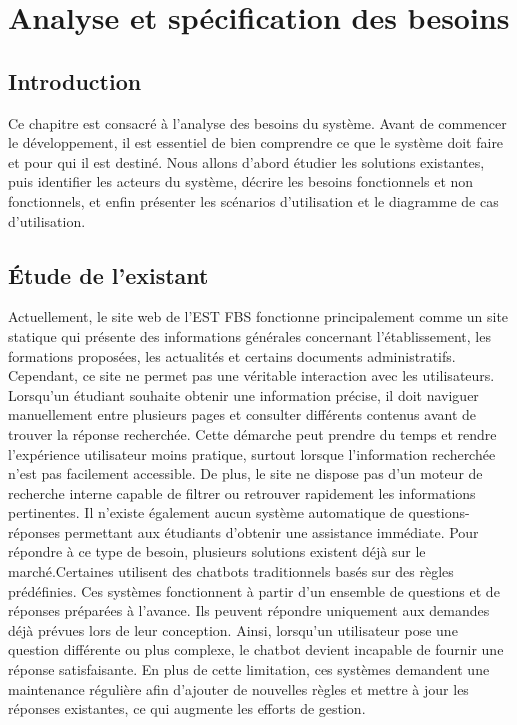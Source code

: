 \documentclass[12pt,a4paper]{report}
\begin{document}
\chapter{Analyse et spécification des besoins}

\section{Introduction}
Ce chapitre est consacré à l'analyse des besoins du système. Avant de commencer le développement, il est essentiel de bien comprendre ce que le système doit faire et pour qui il est destiné. Nous allons d'abord étudier les solutions existantes, puis identifier les acteurs du système, décrire les besoins fonctionnels et non fonctionnels, et enfin présenter les scénarios d'utilisation et le diagramme de cas d'utilisation.

\section{Étude de l'existant}
Actuellement, le site web de l’EST FBS fonctionne principalement comme un site \newline statique qui présente des informations générales concernant l’établissement, les formations proposées, les actualités et certains documents administratifs. Cependant, ce site ne \newline permet pas une véritable interaction avec les utilisateurs. Lorsqu’un étudiant souhaite obtenir une information précise, il doit naviguer manuellement entre plusieurs pages et consulter différents contenus avant de trouver la réponse recherchée. Cette démarche peut prendre du temps et rendre l’expérience utilisateur moins pratique, surtout lorsque \newline l’information recherchée n’est pas facilement accessible. De plus, le site ne dispose pas d’un moteur de recherche interne capable de filtrer ou retrouver rapidement les informations pertinentes. Il n’existe également aucun système automatique de questions-réponses permettant aux étudiants d’obtenir une assistance immédiate.
\newline
Pour répondre à ce type de besoin, plusieurs solutions existent déjà sur le marché.\newline Certaines utilisent des chatbots traditionnels basés sur des règles prédéfinies. Ces systèmes fonctionnent à partir d’un ensemble de questions et de réponses préparées à l’avance. Ils peuvent répondre uniquement aux demandes déjà prévues lors de leur conception. Ainsi, lorsqu’un utilisateur pose une question différente ou plus complexe, le chatbot devient incapable de fournir une réponse satisfaisante. En plus de cette limitation, ces systèmes demandent une maintenance régulière afin d’ajouter de nouvelles règles et mettre à jour les réponses existantes, ce qui augmente les efforts de gestion.
\newpage
\end{document}
